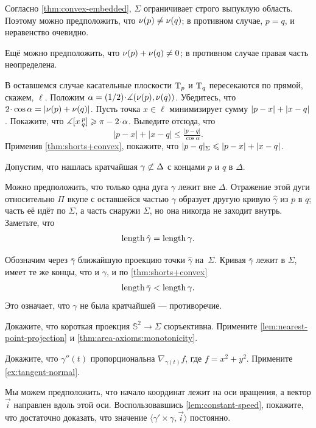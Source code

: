 Согласно \ref{thm:convex-embedded}, $\Sigma$ ограничивает строго выпуклую область.
Поэтому можно предположить, что $\nu(p)\ne\nu(q)$; в противном случае, $p=q$, и неравенство очевидно.

Ещё можно предположить, что $\Norm(p)\z+\Norm(q)\z\ne 0$; в противном случае правая часть неопределена.

В оставшемся случае касательные плоскости $\mathrm{T}_p$ и $\mathrm{T}_q$ пересекаются по прямой, скажем, $\ell$.
Положим $\alpha=\tfrac12\cdot\measuredangle(\Norm(p),\Norm(q))$.
Убедитесь, что $2\cdot\cos\alpha\z= |\Norm(p)+\Norm(q)|$.
Пусть точка $x\in \ell$ минимизирует сумму $|p-x|\z+|x-q|$.
Покажите, что $\measuredangle\hinge xpq\ge \pi-2\cdot\alpha$.
Выведите отсюда, что 
\[
|p-x|+|x-q|\le \tfrac{|p-q|}{\cos\alpha}.
\]
Применив \ref{thm:shorts+convex}, покажите, что
$\dist{p}{q}\Sigma\z\le |p-x|\z+|x-q|$.

Допустим, что нашлась кратчайшая $\gamma\z{\not\subset}\Delta$ с концами $p$ и $q$ в $\Delta$.

Можно предположить, что только одна дуга $\gamma$ лежит вне $\Delta$.
Отражение этой дуги относительно $\Pi$ вкупе с оставшейся частью $\gamma$ образует другую кривую $\hat\gamma$ из $p$ в $q$;
часть её идёт по $\Sigma$, 
а часть снаружи $\Sigma$,
но она никогда не заходит внутрь.
Заметьте, что
\[\mathop{\rm length}\nolimits\hat\gamma=\mathop{\rm length}\nolimits\gamma.\]

Обозначим через $\bar\gamma$ ближайшую проекцию точки $\hat\gamma$ на~$\Sigma$.
Кривая $\bar\gamma$ лежит в $\Sigma$, 
имеет те же концы, что и $\gamma$,
и по \ref{thm:shorts+convex}
\[\mathop{\rm length}\nolimits\bar\gamma<\mathop{\rm length}\nolimits\gamma.\]
Это означает, что $\gamma$ не была кратчайшей --- 
противоречие.

Докажите, что короткая проекция $\mathbb{S}^2\to\Sigma$ сюръективна.
Примените \ref{lem:nearest-point-projection} и \ref{thm:area-axioms:monotonicity}.


\setcounter{eqtn}{0}

Докажите, что $\gamma''(t)$ пропорциональна $\nabla_{\gamma(t)} f$, где $f=x^2+y^2$. 
Примените \ref{ex:tangent-normal}.

Мы можем предположить, что начало координат лежит на оси вращения, а вектор $\vec i$ направлен вдоль этой оси.
Воспользовавшись \ref{lem:constant-speed}, покажите, что достаточно доказать, что 
значение $\langle\gamma'\times \gamma,\vec i\rangle$ постоянно.

